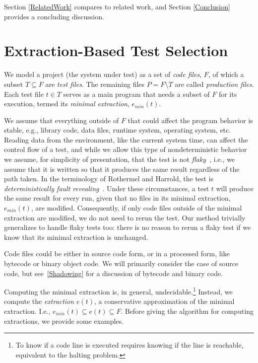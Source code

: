 {Section \ref{RelatedWork} compares to related work, and Section \ref{Conclusion} provides a concluding discussion.

\section{Extraction-Based Test Selection}
\label{Extraction}

We model a project (the system under test) as a set of \emph{code files}, $F$, of which a subset $T \subseteq F$ are \emph{test files}. The remaining files $P = F \setminus T$ are called \emph{production files}. Each test file $t \in T$ serves as a main program that needs a subset of $F$ for its execution, termed its \emph{minimal extraction}, $e_{min}(t)$.

We assume that everything outside of $F$ that could affect the program behavior is stable, e.g., library code, data files, runtime system, operating system, etc. Reading data from the environment, like the current system time, can affect the control flow of a test, and while we allow this type of nondeterministic behavior we assume, for simplicity of presentation, that the test is not \emph{flaky}~\cite{luo2014empirical}, i.e., we assume that it is written so that it produces the same result regardless of the path taken. In the terminology of Rothermel and Harrold, the test is \emph{deterministically fault revealing}~\cite{rothermel1996analyzing}.
Under these circumstances, a test $t$ will produce the same result for every run, given that no files in its minimal extraction, $e_{min}(t)$, are modified. Consequently, if only code files outside of the minimal extraction are modified, we do not need to rerun the test. Our method trivially generalizes to handle flaky tests too: there is no reason to rerun a flaky test if we know that its minimal extraction is unchanged.

Code files could be either in source code form, or in a processed form, like bytecode or binary object code. We will primarily consider the case of source code, but see~\ref{Shadowing} for a discussion of bytecode and binary code.

Computing the minimal extraction is, in general, undecidable.\footnote{To know if a code line is executed requires knowing if the line is reachable, equivalent to the halting problem.} Instead, we compute the \emph{extraction} $e(t)$, a conservative approximation of the minimal extraction. I.e., $e_{min}(t) \subseteq e(t) \subseteq F$. Before giving the algorithm for computing extractions, we provide some examples.

}
